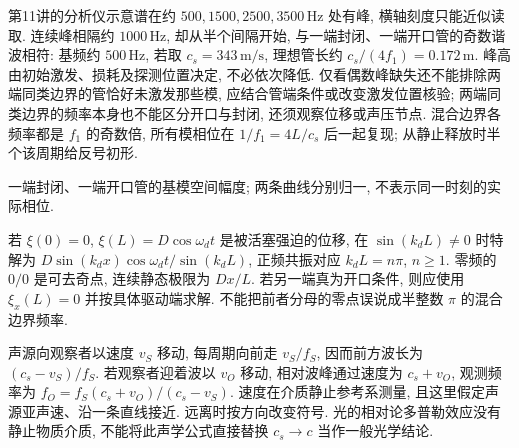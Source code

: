 第11讲的分析仪示意谱在约 $500,1500,2500,3500\,\mathrm{Hz}$ 处有峰, 横轴刻度只能近似读取. 连续峰相隔约 $1000\,\mathrm{Hz}$, 却从半个间隔开始, 与一端封闭、一端开口管的奇数谐波相符: 基频约 $500\,\mathrm{Hz}$, 若取 $c_s=343\,\mathrm{m/s}$, 理想管长约 $c_s/(4f_1)=0.172\,\mathrm m$. 峰高由初始激发、损耗及探测位置决定, 不必依次降低. 仅看偶数峰缺失还不能排除两端同类边界的管恰好未激发那些模, 应结合管端条件或改变激发位置核验; 两端同类边界的频率本身也不能区分开口与封闭, 还须观察位移或声压节点. 混合边界各频率都是 $f_1$ 的奇数倍, 所有模相位在 $1/f_1=4L/c_s$ 后一起复现; 从静止释放时半个该周期给反号初形.

\begin{center}
\par
一端封闭、一端开口管的基模空间幅度; 两条曲线分别归一, 不表示同一时刻的实际相位.
\end{center}
若 $\xi(0)=0$, $\xi(L)=D\cos\omega_dt$ 是被活塞强迫的位移, 在 $\sin(k_dL)\ne0$ 时特解为 $D\sin(k_dx)\cos\omega_dt/\sin(k_dL)$, 正频共振对应 $k_dL=n\pi$, $n\ge1$. 零频的 $0/0$ 是可去奇点, 连续静态极限为 $Dx/L$. 若另一端真为开口条件, 则应使用 $\xi_x(L)=0$ 并按具体驱动端求解. 不能把前者分母的零点误说成半整数 $\pi$ 的混合边界频率.

声源向观察者以速度 $v_S$ 移动, 每周期向前走 $v_S/f_S$, 因而前方波长为 $(c_s-v_S)/f_S$. 若观察者迎着波以 $v_O$ 移动, 相对波峰通过速度为 $c_s+v_O$, 观测频率为 $f_O=f_S(c_s+v_O)/(c_s-v_S)$. 速度在介质静止参考系测量, 且这里假定声源亚声速、沿一条直线接近. 远离时按方向改变符号. 光的相对论多普勒效应没有静止物质介质, 不能将此声学公式直接替换 $c_s\to c$ 当作一般光学结论.
